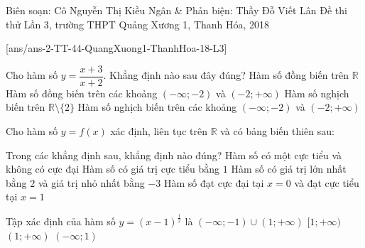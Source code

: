 \begin{name}
{Biên soạn: Cô Nguyễn Thị Kiều Ngân \& Phản biện: Thầy Đỗ Viết Lân}
{Đề thi thử Lần 3, trường THPT Quảng Xương 1, Thanh Hóa, 2018}
\end{name}
\setcounter{ex}{0}\setcounter{bt}{0}
[ans/ans-2-TT-44-QuangXuong1-ThanhHoa-18-L3]
\begin{ex}%
Cho hàm số $y=\dfrac{x+3}{x+2}$. Khẳng định nào sau đây đúng?
\choice
{Hàm số đồng biến trên $\mathbb{R}$}
{Hàm số đồng biến trên các khoảng $(-\infty;-2)$ và $(-2;+\infty)$}
{Hàm số nghịch biến trên $\mathbb{R}\setminus \{2\}$}
{\True Hàm số nghịch biến trên các khoảng $(-\infty;-2)$ và $(-2;+\infty)$}
\end{ex}

\begin{ex}%
Cho hàm số $y=f(x)$ xác định, liên tục trên $\mathbb{R}$ và có bảng biến thiên sau:
\begin{center}
\end{center}
Trong các khẳng định sau, khẳng định nào đúng?
	\choice
	{Hàm số có một cực tiểu và không có cực đại}
	{Hàm số có giá trị cực tiểu bằng $1$}
	{Hàm số có giá trị lớn nhất bằng $2$ và giá trị nhỏ nhất bằng $-3$}
	{\True Hàm số đạt cực đại tại $x=0$ và đạt cực tiểu tại $x=1$}
\end{ex}

\begin{ex}%
	Tập xác định của hàm số $y=(x-1)^\frac{1}{2}$ là
	\choice
	{$(-\infty;-1)\cup (1;+\infty)$}
	{$[1;+\infty)$}
	{\True $(1;+\infty)$}
	{$(-\infty;1)$}
\end{ex}

